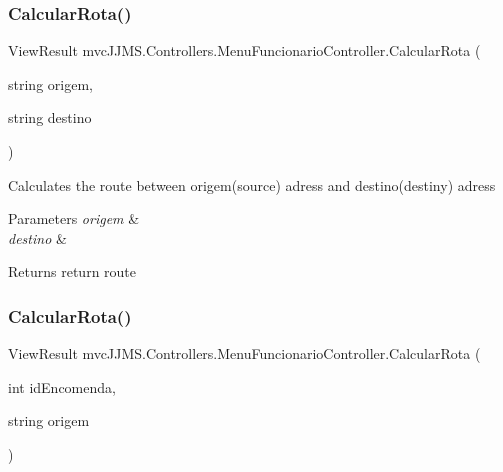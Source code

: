 \subsubsection{\texorpdfstring{Calcular\+Rota()}{CalcularRota()}\hspace{0.1cm}{\footnotesize\ttfamily [1/2]}}
{\footnotesize\ttfamily View\+Result mvc\+J\+J\+M\+S.\+Controllers.\+Menu\+Funcionario\+Controller.\+Calcular\+Rota (\begin{DoxyParamCaption}\item[{string}]{origem,  }\item[{string}]{destino }\end{DoxyParamCaption})\hspace{0.3cm}{\ttfamily [inline]}}



Calculates the route between origem(source) adress and destino(destiny) adress 


\begin{DoxyParams}{Parameters}
{\em origem} & \\
\hline
{\em destino} & \\
\hline
\end{DoxyParams}
\begin{DoxyReturn}{Returns}
return route
\end{DoxyReturn}
\mbox{\label{classmvc_j_j_m_s_1_1_controllers_1_1_menu_funcionario_controller_aafa0339ff14c5dfd9bb25a36efa89538}} 
\subsubsection{\texorpdfstring{Calcular\+Rota()}{CalcularRota()}\hspace{0.1cm}{\footnotesize\ttfamily [2/2]}}
{\footnotesize\ttfamily View\+Result mvc\+J\+J\+M\+S.\+Controllers.\+Menu\+Funcionario\+Controller.\+Calcular\+Rota (\begin{DoxyParamCaption}\item[{int}]{id\+Encomenda,  }\item[{string}]{origem }\end{DoxyParamCaption})\hspace{0.3cm}{\ttfamily [inline]}}



